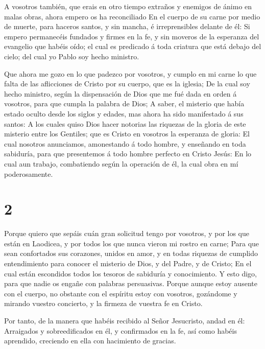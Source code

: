  A vosotros también, que erais en otro tiempo extraños y
enemigos de ánimo en malas obras, ahora empero os ha reconciliado
 En el cuerpo de su carne por medio de muerte, para haceros
santos, y sin mancha, é irreprensibles delante de él:  Si
empero permanecéis fundados y firmes en la fe, y sin moveros de la
esperanza del evangelio que habéis oído; el cual es predicado á toda
criatura que está debajo del cielo; del cual yo Pablo soy hecho
ministro.

 Que ahora me gozo en lo que padezco por vosotros, y cumplo
en mi carne lo que falta de las aflicciones de Cristo por su cuerpo, que
es la iglesia;  De la cual soy hecho ministro, según la
dispensación de Dios que me fué dada en orden á vosotros, para que
cumpla la palabra de Dios;  A saber, el misterio que había
estado oculto desde los siglos y edades, mas ahora ha sido manifestado á
sus santos:  A los cuales quiso Dios hacer notorias las
riquezas de la gloria de este misterio entre los Gentiles; que es Cristo
en vosotros la esperanza de gloria:  El cual nosotros
anunciamos, amonestando á todo hombre, y enseñando en toda sabiduría,
para que presentemos á todo hombre perfecto en Cristo Jesús:
 En lo cual aun trabajo, combatiendo según la operación de
él, la cual obra en mí poderosamente.

\hypertarget{section-1}{%
\section{2}\label{section-1}}

 Porque quiero que sepáis cuán gran solicitud tengo por
vosotros, y por los que están en Laodicea, y por todos los que nunca
vieron mi rostro en carne;  Para que sean confortados sus
corazones, unidos en amor, y en todas riquezas de cumplido entendimiento
para conocer el misterio de Dios, y del Padre, y de Cristo; 
En el cual están escondidos todos los tesoros de sabiduría y
conocimiento.  Y esto digo, para que nadie os engañe con
palabras persuasivas.  Porque aunque estoy ausente con el
cuerpo, no obstante con el espíritu estoy con vosotros, gozándome y
mirando vuestro concierto, y la firmeza de vuestra fe en Cristo.

 Por tanto, de la manera que habéis recibido al Señor
Jesucristo, andad en él:  Arraigados y sobreedificados en
él, y confirmados en la fe, así como habéis aprendido, creciendo en ella
con hacimiento de gracias.

